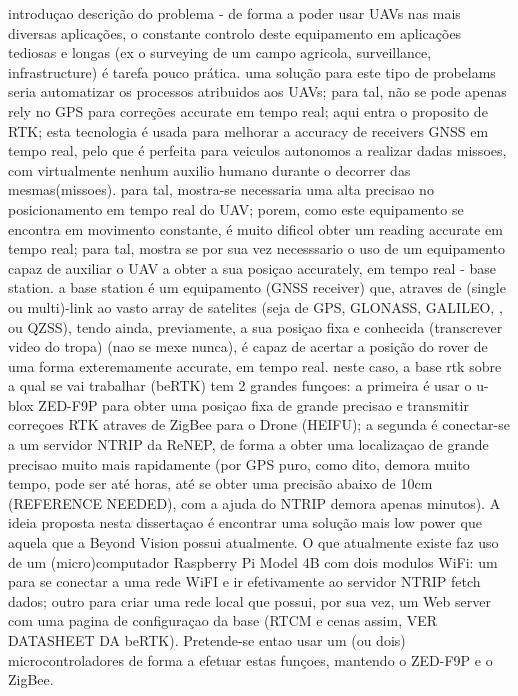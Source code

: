 introduçao
    descrição do problema - de forma a poder usar UAVs nas mais diversas aplicações, o constante controlo deste equipamento em aplicações tediosas e longas (ex o surveying de um campo agricola, surveillance, infrastructure) é tarefa pouco prática. uma solução para este tipo de probelams seria automatizar os processos atribuidos aos UAVs; para tal, não se pode apenas rely no GPS para correções accurate em tempo real; aqui entra o proposito de RTK; esta tecnologia é usada para melhorar a accuracy de receivers GNSS em tempo real, pelo que é perfeita para veiculos autonomos a realizar dadas missoes, com virtualmente nenhum auxilio humano durante o decorrer das mesmas(missoes). para tal, mostra-se necessaria uma alta precisao no posicionamento em tempo real do UAV; porem, como este equipamento se encontra em movimento constante, é muito dificol obter um reading accurate em tempo real; para tal, mostra se por sua vez necesssario o uso de um equipamento capaz de auxiliar o UAV a obter a sua posiçao accurately, em tempo real - base station. a base station é um equipamento (GNSS receiver) que, atraves de (single ou multi)-link ao vasto array de satelites (seja de GPS, GLONASS, GALILEO, , ou QZSS), tendo ainda, previamente, a sua posiçao fixa e conhecida (transcrever video do tropa) (nao se mexe nunca), é capaz de acertar a posição do rover de uma forma exteremamente accurate, em tempo real.
    neste caso, a base rtk sobre a qual se vai trabalhar (beRTK) tem 2 grandes funçoes: a primeira é usar o u-blox ZED-F9P para obter uma posiçao fixa de grande precisao e transmitir correçoes RTK atraves de ZigBee para o Drone (HEIFU); a segunda é conectar-se a um servidor NTRIP da ReNEP, de forma a obter uma localizaçao de grande precisao muito mais rapidamente (por GPS puro, como dito, demora muito tempo, pode ser até horas, até se obter uma precisão abaixo de 10cm (REFERENCE NEEDED), com a ajuda do NTRIP demora apenas minutos).
    A ideia proposta nesta dissertaçao é encontrar uma solução mais low power que aquela que a Beyond Vision possui atualmente. O que atualmente existe faz uso de um (micro)computador Raspberry Pi Model 4B com dois modulos WiFi: um para se conectar a uma rede WiFI e ir efetivamente ao servidor NTRIP fetch dados; outro para criar uma rede local que possui, por sua vez, um Web server com uma pagina de configuraçao da base (RTCM e cenas assim, VER DATASHEET DA beRTK). Pretende-se entao usar um (ou dois) microcontroladores de forma a efetuar estas funçoes, mantendo o ZED-F9P e o ZigBee.
